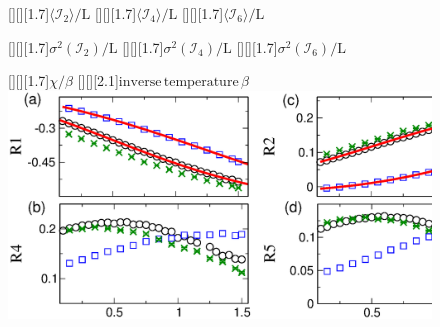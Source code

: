 \documentclass[12pt]{article}
\begin{document}

\begin{figure}
[][][1.7]{$\langle{\mathcal I}_2\rangle/\mathrm{L}$}
[][][1.7]{$\langle{\mathcal I}_4\rangle/\mathrm{L}$}
[][][1.7]{$\langle{\mathcal I}_6\rangle/\mathrm{L}$}

[][][1.7]{$\sigma^2({\mathcal I}_2)/\mathrm{L}$}
[][][1.7]{$\sigma^2({\mathcal I}_4)/\mathrm{L}$}
[][][1.7]{$\sigma^2({\mathcal I}_6)/\mathrm{L}$}

[][][1.7]{$\chi/\beta$}
[][][2.1]{$\mathrm{inverse}\, \mathrm{temperature}\, \beta$}
\includegraphics{fig1.eps}
\end{figure}
\end{document}
